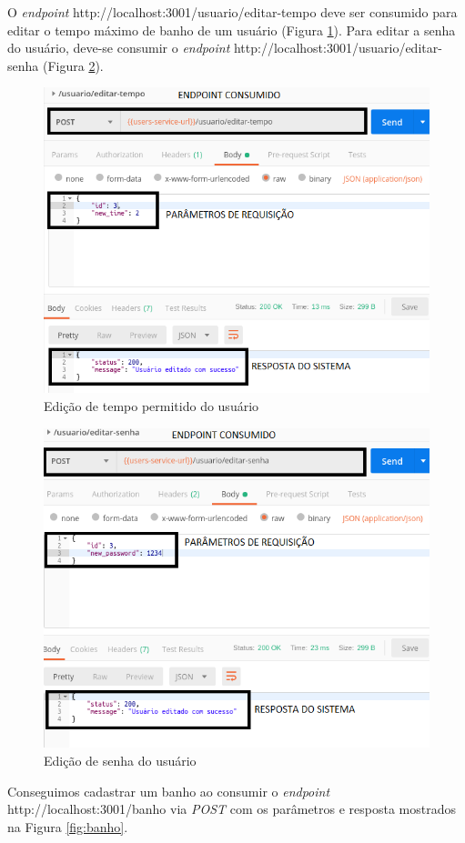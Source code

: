 \clearpage

O \textit{endpoint} http://localhost:3001/usuario/editar-tempo deve ser consumido para editar o tempo máximo de banho de um usuário (Figura \ref{fig:tempo}). Para editar a senha do usuário, deve-se consumir o \textit{endpoint} http://localhost:3001/usuario/editar-senha (Figura \ref{fig:senha}).

\begin{figure}[htbp]
	\centering
	\includegraphics[width=0.7\linewidth]{figuras/postman/time.png}
	\caption{Edição de tempo permitido do usuário}
	\label{fig:tempo}
\end{figure}

\begin{figure}[htbp]
	\centering
	\includegraphics[width=0.7\linewidth]{figuras/postman/password.png}
	\caption{Edição de senha do usuário}
	\label{fig:senha}
\end{figure}

Conseguimos cadastrar um banho ao consumir o \textit{endpoint} http://localhost:3001/banho via \textit{POST} com os parâmetros e resposta mostrados na Figura \ref{fig:banho}.

